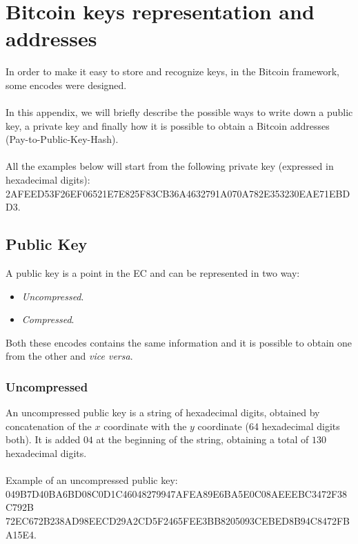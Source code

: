 
\chapter{Bitcoin keys representation and addresses}%

\label{AppendixA} %


In order to make it easy to store and recognize keys, in the Bitcoin framework, some encodes were designed.
\\ \\
In this appendix, we will briefly describe the possible ways to write down a public key, a private key and finally how it is possible to obtain a Bitcoin addresses (Pay-to-Public-Key-Hash).
\\ \\
All the examples below will start from the following private key (expressed in hexadecimal digits): \\
2AFEED53F26EF06521E7E825F83CB36A4632791A070A782E353230EAE71EBDD3.


\section{Public Key}
A public key is a point in the EC and can be represented in two way:
\begin{itemize}
	\item \textit{Uncompressed}.
	\item \textit{Compressed}.
\end{itemize}
 Both these encodes contains the same information and it is possible to obtain one from the other and \textit{vice versa}. 

\subsection{Uncompressed}
An uncompressed public key is a string of hexadecimal digits, obtained by concatenation of the $x$ coordinate with the $y$ coordinate (64 hexadecimal digits both). It is added $04$ at the beginning of the string, obtaining a total of $130$ hexadecimal digits. \\ \\
Example of an uncompressed public key: \\
049B7D40BA6BD08C0D1C46048279947AFEA89E6BA5E0C08AEEEBC3472F38C792B
72EC672B238AD98EECD29A2CD5F2465FEE3BB8205093CEBED8B94C8472FBA15E4.


